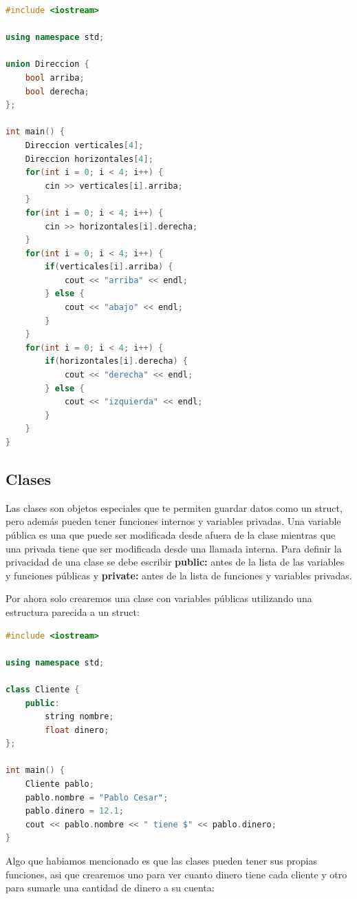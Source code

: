 \documentclass{article}
\begin{document}
\begin{lstlisting}[language=C++, caption=Uniones]
#include <iostream>

using namespace std;

union Direccion {
    bool arriba;
    bool derecha;
};

int main() {
    Direccion verticales[4];
    Direccion horizontales[4];
    for(int i = 0; i < 4; i++) {
        cin >> verticales[i].arriba;
    }
    for(int i = 0; i < 4; i++) {
        cin >> horizontales[i].derecha;
    }
    for(int i = 0; i < 4; i++) {
        if(verticales[i].arriba) {
            cout << "arriba" << endl;
        } else {
            cout << "abajo" << endl;
        }
    }
    for(int i = 0; i < 4; i++) {
        if(horizontales[i].derecha) {
            cout << "derecha" << endl;
        } else {
            cout << "izquierda" << endl;
        }
    }
}
\end{lstlisting}

\subsection{Clases}

Las clases son objetos especiales que te permiten guardar datos como un struct, pero además pueden tener funciones internos y variables privadas. Una variable pública es una que puede ser modificada desde afuera de la clase mientras que una privada tiene que ser modificada desde una llamada interna. Para definir la privacidad de una clase se debe escribir \textbf{public:} antes de la lista de las variables y funciones públicas y \textbf{private:} antes de la lista de funciones y variables privadas.

Por ahora solo crearemos una clase con variables públicas utilizando una estructura parecida a un struct:

\begin{lstlisting}[language=C++, caption=Declarando clases]
#include <iostream>

using namespace std;

class Cliente {
    public:
        string nombre;
        float dinero;
};

int main() {
    Cliente pablo;
    pablo.nombre = "Pablo Cesar";
    pablo.dinero = 12.1;
    cout << pablo.nombre << " tiene $" << pablo.dinero;
}
\end{lstlisting}

Algo que habiamos mencionado es que las clases pueden tener sus propias funciones, asi que crearemos uno para ver cuanto dinero tiene cada cliente y otro para sumarle una cantidad de dinero a su cuenta:
\end{document}
